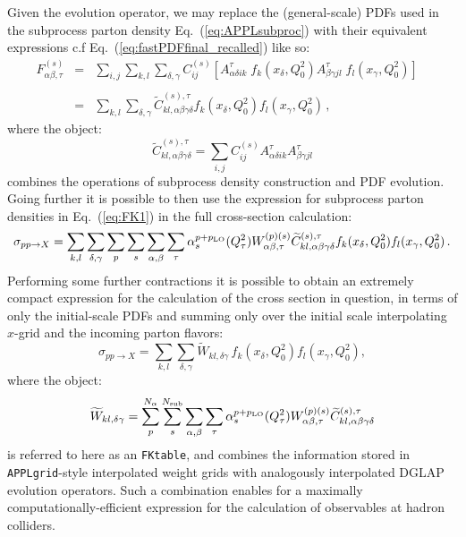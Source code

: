 \documentclass[preprint,12pt]{elsarticle}
\begin{document}
Given the evolution operator, we may replace the (general-scale) PDFs
used in the subprocess parton density Eq.~(\ref{eq:APPLsubproc}) with
their equivalent expressions c.f Eq.~(\ref{eq:fastPDFfinal_recalled})
like so:
\begin{equation}\label{eq:FK1}
\begin{array}{rcl}
F^{(s)}_{\alpha\beta,\tau} &=&  \displaystyle \sum_{i,j} \sum_{k,l}
                               \sum_{\delta,\gamma} C^{(s)}_{ij}
                               \left[  A^\tau_{\alpha\delta ik}\;
                               f_k(x_\delta,Q^2_0) A^\tau_{\beta\gamma
                               jl}\; f_l(x_\gamma,Q^2_0) \right]\;\;\;
  \\
\\
&=& \displaystyle \sum_{k,l}\sum_{\delta,\gamma}
\widetilde{C}^{(s),\tau}_{kl,\alpha\beta\gamma\delta}
f_k(x_\delta,Q^2_0) f_l(x_\gamma,Q^2_0)\,,
\end{array}
\end{equation}
where the object:
\begin{equation}
  \widetilde{C}^{(s),\tau}_{kl,\alpha\beta\gamma\delta} =
  \sum_{i,j} C^{(s)}_{ij} A^\tau_{\alpha\delta ik}
  A^\tau_{\beta\gamma jl}
\end{equation}
combines the operations of subprocess density construction and PDF
evolution. Going further it is possible to then use the expression for
subprocess parton densities in Eq.~(\ref{eq:FK1}) in the full
cross-section calculation:
\begin{equation}
\sigma_{pp\to X} = \sum_{k,l}\sum_{\delta,\gamma}\sum_p
\sum_{s} \sum_{\alpha,\beta}
\sum_{\tau} 
\alpha_s^{p+p_{\rm LO}}(Q^2_\tau)W_{\alpha\beta,\tau}^{(p)(s)} \widetilde{C}^{(s),\tau}_{kl,\alpha\beta\gamma\delta}
f_k(x_\delta,Q^2_0) f_l(x_\gamma,Q^2_0)\,.
\end{equation}
Performing some further contractions it is possible to obtain an
extremely compact expression for the calculation of the cross section
in question, in terms of only the initial-scale PDFs and summing only
over the initial scale interpolating $x$-grid and the incoming parton
flavors:
\begin{equation}\label{eq:FK}
  \sigma _{pp\to X} = \sum_{k,l}\sum_{\delta,\gamma} 
  \widetilde{W}_{kl,\delta\gamma} \,f_k(x_\delta,Q^2_0) f_l(x_\gamma,Q^2_0),
\end{equation}
where the object:
\begin{equation}\label{eq:FKTable}
  \widetilde{W}_{kl,\delta\gamma} = \sum_p^{N_\alpha} \sum_{s}^{N_{\mathrm{sub}}} \sum_{\alpha,\beta} \sum_{\tau}
\alpha_s^{p+p_{\rm LO}}(Q^2_\tau)  W_{\alpha\beta,\tau}^{(p)(s)} \widetilde{C}^{(s),\tau}_{kl,\alpha\beta\gamma\delta}
\end{equation}
is referred to here as an {\tt FKtable}, and combines the information
stored in {\tt APPLgrid}-style interpolated weight grids with
analogously interpolated DGLAP evolution operators. Such a combination
enables for a maximally computationally-efficient expression for the
calculation of observables at hadron colliders.
\end{document}
